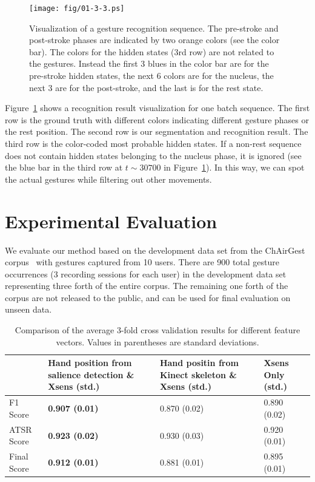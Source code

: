 \documentclass{sig-alternate-2013}
\begin{document}
\begin{figure}[tb]
\centering
\texttt{[image: fig/01-3-3.ps]}
\caption{Visualization of a gesture recognition sequence. 
The pre-stroke and post-stroke phases are indicated by two orange colors (see the color bar). 
The colors for the hidden states (3rd row) are not related 
to the gestures. Instead the first 3 blues in the color bar are for the pre-stroke hidden states, the next 6 colors are for the nucleus, 
the next 3 are for the post-stroke, and the last is for the rest state.}
\label{fig:decoding}
\end{figure}

Figure~\ref{fig:decoding} shows a recognition result visualization for one batch sequence. The first
row is the ground truth with different colors indicating different gesture phases or the rest position. 
The second row is our segmentation and recognition result.
The third row is the color-coded most probable hidden states. If a non-rest sequence does not contain hidden states belonging to the nucleus phase, 
it is ignored (see the blue bar in the third row at $t\sim 30700$ in Figure~\ref{fig:decoding}). In
this way, we can spot the actual gestures while filtering out other movements.

\section{Experimental Evaluation}\label{sec:eval}
We evaluate our method based on the development data set from the ChAirGest
corpus~\cite{Ruffieux2013} with gestures captured from 10 users. There are 900
total gesture occurrences (3 recording sessions for each user) in the
development data set representing three forth of the entire corpus. The remaining one forth of the corpus are not released to
the public, and can be used for final evaluation on unseen data.

\begin{table}[tb]
\begin{center}
\begin{tabular}{|l|p{2cm}|p{1.7cm}|p{1.7cm}|}
\hline
 & Hand position from salience detection \& Xsens (std.) & Hand positin
 from Kinect skeleton \& Xsens (std.) & Xsens Only (std.)\\
\hline
F1 Score & \textbf{0.907 (0.01)} & 0.870 (0.02) & 0.890 (0.02) \\
\hline
ATSR Score & \textbf{0.923 (0.02)} & 0.930 (0.03) & 0.920 (0.01) \\
\hline
Final Score & \textbf{0.912 (0.01)} & 0.881 (0.01) & 0.895 (0.01) \\
\hline
\end{tabular}
\caption{Comparison of the average 3-fold cross validation results for different
feature vectors. Values in parentheses are standard deviations.}
\label{tab:comp-feature}
\end{center}
\end{table}
\end{document}
